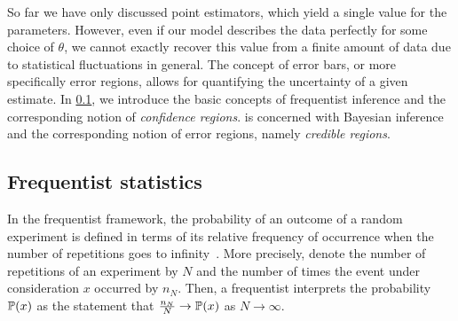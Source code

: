 So far we have only discussed point estimators, which yield a single value for the parameters.
However, even if our model describes the data perfectly for some choice of $\theta$, we cannot exactly recover this value from a finite amount of data due to statistical fluctuations in general.
The concept of error bars, or more specifically error regions, allows for quantifying the uncertainty of a given estimate.
In \cref{sub:stat.frequentist}, we introduce the basic concepts of frequentist inference and the corresponding notion of \emph{confidence regions}.
 is concerned with Bayesian inference and the corresponding notion of error regions, namely \emph{credible regions}.



\subsection{Frequentist statistics}%
\label{sub:stat.frequentist}

In the frequentist framework, the probability of an outcome of a random experiment is defined in terms of its relative frequency of occurrence when the number of repetitions goes to infinity~\cite{Keynes_2007_Treatise,Kiefer_2012_Introduction}.
More precisely, denote the number of repetitions of an experiment by $N$ and the number of times the event under consideration $x$ occurred by $n_N$.
Then, a frequentist interprets the probability $\mathbb{P}(x)$ as the statement that $\frac{n_N}{N} \to \mathbb{P}(x)$ as $N \to \infty$.

